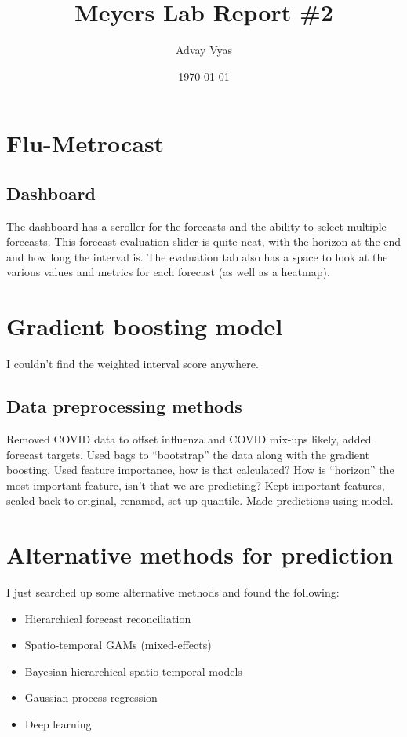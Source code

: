 \documentclass[12pt]{article}
\title{Meyers Lab Report \#2}
\author{Advay Vyas}
\date{\today}
\begin{document}
\maketitle

\tableofcontents


\section{Flu-Metrocast}
\subsection{Dashboard}
The dashboard has a scroller for the forecasts and the ability to select multiple forecasts. This forecast evaluation slider is quite neat, with the horizon at the end and how long the interval is. The evaluation tab also has a space to look at the various values and metrics for each forecast (as well as a heatmap). 

\section{Gradient boosting model}
I couldn't find the weighted interval score anywhere.
\subsection{Data preprocessing methods}
Removed COVID data to offset influenza and COVID mix-ups likely, added forecast targets. Used bags to ``bootstrap'' the data along with the gradient boosting. Used feature importance, how is that calculated? How is ``horizon'' the most important feature, isn't that we are predicting? Kept important features, scaled back to original, renamed, set up quantile. Made predictions using model.


\section{Alternative methods for prediction}
I just searched up some alternative methods and found the following:
\begin{itemize}
    \item Hierarchical forecast reconciliation
    \item Spatio-temporal GAMs (mixed-effects)
    \item Bayesian hierarchical spatio-temporal models
    \item Gaussian process regression
    \item Deep learning
\end{itemize}
\end{document}
